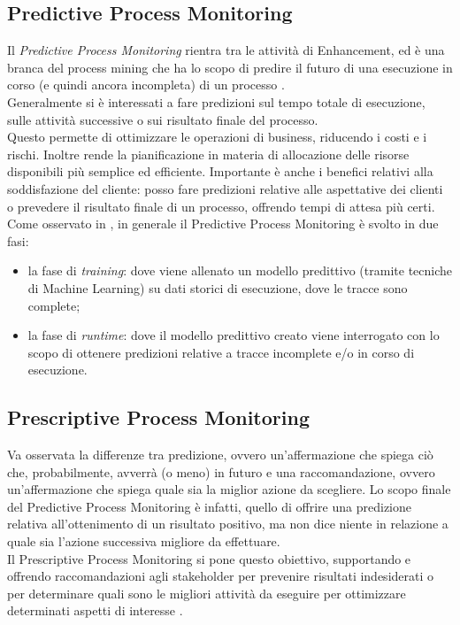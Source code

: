 \subsection{Predictive Process Monitoring}
Il \textit{Predictive Process Monitoring} rientra tra le attività di Enhancement, ed è una branca del process mining che ha lo scopo di predire il futuro di una esecuzione in corso (e quindi ancora incompleta) di un processo \cite{pm-handbook}.
\\
Generalmente si è interessati a fare predizioni sul tempo totale di esecuzione, sulle attività successive o sui risultato finale del processo.
\\
Questo permette di ottimizzare le operazioni di business, riducendo i costi e i rischi. Inoltre rende la pianificazione in materia di allocazione delle risorse disponibili più semplice ed efficiente.
Importante è anche i benefici relativi alla soddisfazione del cliente: posso fare predizioni relative alle aspettative dei clienti o prevedere il risultato finale di un processo, offrendo tempi di attesa più certi. 
\\
Come osservato in \cite{pm-handbook}, in generale il Predictive Process Monitoring è svolto in due fasi:
\begin{itemize}
\item la fase di \textit{training}: dove viene allenato un modello predittivo (tramite tecniche di Machine Learning) su dati storici di esecuzione, dove le tracce sono complete;
\item la fase di \textit{runtime}: dove il modello predittivo creato viene interrogato con lo scopo di ottenere predizioni relative a tracce incomplete e/o in corso di esecuzione.
\end{itemize}

\subsection{Prescriptive Process Monitoring}
Va osservata la differenze tra predizione, ovvero un'affermazione che spiega ciò che, probabilmente, avverrà (o meno) in futuro e una raccomandazione, ovvero un'affermazione che spiega quale sia la miglior azione da scegliere.
Lo scopo finale del Predictive Process Monitoring è infatti, quello di offrire una predizione relativa all'ottenimento di un risultato positivo, ma non dice niente in relazione a quale sia l'azione successiva migliore da effettuare.
\\
Il Prescriptive Process Monitoring si pone questo obiettivo, supportando e offrendo raccomandazioni agli stakeholder per prevenire risultati indesiderati o per determinare quali sono le migliori attività da eseguire per ottimizzare determinati aspetti di interesse \cite{pm-handbook}.



